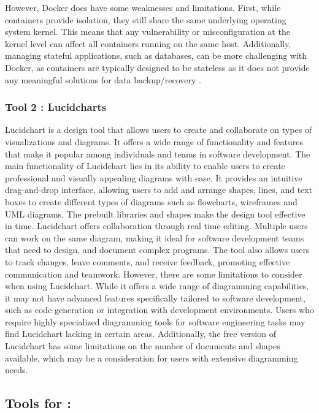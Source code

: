 \documentclass[a4paper, 11pt]{report}
\begin{document}
However, Docker does have some weaknesses and limitations. First, while containers provide isolation, they still share the same underlying operating system kernel. This means that any vulnerability or misconfiguration at the kernel level can affect all containers running on the same host. Additionally, managing stateful applications, such as databases, can be more challenging with Docker, as containers are typically designed to be stateless as it does not provide any meaningful solutions for data backup/recovery  \cite{linkedin}.

\subsubsection{Tool 2 : Lucidcharts}
Lucidchart is a design tool that allows users to create and collaborate on types of visualizations and diagrams. It offers a wide range of functionality and features that make it popular among individuals and teams in software development.   \cite{lucidchart} The main functionality of Lucidchart lies in its ability to enable users to create professional and visually appealing diagrams with ease. It provides an intuitive drag-and-drop interface, allowing users to add and arrange shapes, lines, and text boxes to create different types of diagrams such as flowcharts, wireframes and UML diagrams. The prebuilt libraries and shapes make the design tool effective in time. Lucidchart offers collaboration through real time editing. Multiple users can work on the same diagram, making it ideal for software development teams that need to design, and document complex programs. The tool also allows users to track changes, leave comments, and receive feedback, promoting effective communication and teamwork. However, there are some limitations to consider when using Lucidchart. While it offers a wide range of diagramming capabilities, it may not have advanced features specifically tailored to software development, such as code generation or integration with development environments. Users who require highly specialized diagramming tools for software engineering tasks may find Lucidchart lacking in certain areas. Additionally, the free version of Lucidchart has some limitations on the number of documents and shapes available, which may be a consideration for users with extensive diagramming needs.

\subsection{Tools for \majD: \studD}
\end{document}

